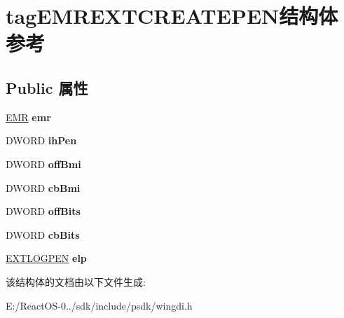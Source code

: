 \hypertarget{structtag_e_m_r_e_x_t_c_r_e_a_t_e_p_e_n}{}\section{tag\+E\+M\+R\+E\+X\+T\+C\+R\+E\+A\+T\+E\+P\+E\+N结构体 参考}
\label{structtag_e_m_r_e_x_t_c_r_e_a_t_e_p_e_n}
\subsection*{Public 属性}
\begin{DoxyCompactItemize}
\item 
\mbox{\label{structtag_e_m_r_e_x_t_c_r_e_a_t_e_p_e_n_a9bd38c016e9a55caf56bae2208a6eed7}} 
\hyperlink{structtag_e_m_r}{E\+MR} {\bfseries emr}
\item 
\mbox{\label{structtag_e_m_r_e_x_t_c_r_e_a_t_e_p_e_n_a07937b1264ba4f1dbf8d0670c2f451a0}} 
D\+W\+O\+RD {\bfseries ih\+Pen}
\item 
\mbox{\label{structtag_e_m_r_e_x_t_c_r_e_a_t_e_p_e_n_a6d053a33d447184fb5723ffa24878eeb}} 
D\+W\+O\+RD {\bfseries off\+Bmi}
\item 
\mbox{\label{structtag_e_m_r_e_x_t_c_r_e_a_t_e_p_e_n_a3b6baa59927aec41ce73627a738092e5}} 
D\+W\+O\+RD {\bfseries cb\+Bmi}
\item 
\mbox{\label{structtag_e_m_r_e_x_t_c_r_e_a_t_e_p_e_n_a63d167ec12393e530e127b6c047b26ba}} 
D\+W\+O\+RD {\bfseries off\+Bits}
\item 
\mbox{\label{structtag_e_m_r_e_x_t_c_r_e_a_t_e_p_e_n_ae7ebbd82dcba398ac84c8ef7f4b3cd33}} 
D\+W\+O\+RD {\bfseries cb\+Bits}
\item 
\mbox{\label{structtag_e_m_r_e_x_t_c_r_e_a_t_e_p_e_n_a5e9e9ad08707066fc69978be3832b78a}} 
\hyperlink{structtag_e_x_t_l_o_g_p_e_n}{E\+X\+T\+L\+O\+G\+P\+EN} {\bfseries elp}
\end{DoxyCompactItemize}


该结构体的文档由以下文件生成\+:\begin{DoxyCompactItemize}
\item 
E\+:/\+React\+O\+S-\/0../sdk/include/psdk/wingdi.\+h\end{DoxyCompactItemize}
